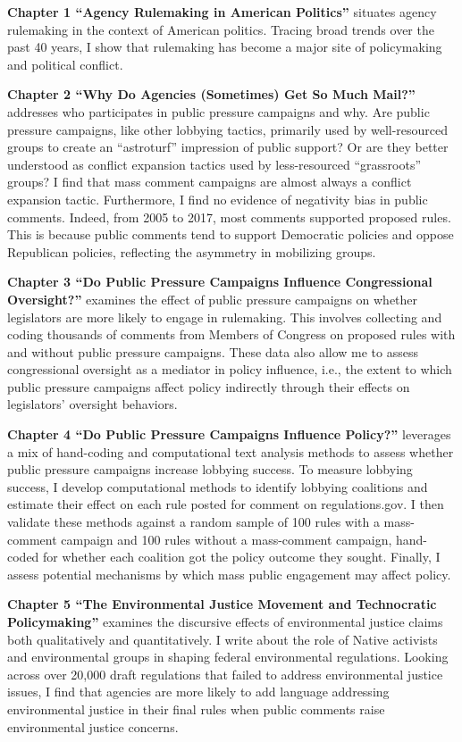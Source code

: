 \documentclass[
]{book}
\begin{document}
\textbf{Chapter 1 ``Agency Rulemaking in American Politics''} situates agency rulemaking in the context of American politics. Tracing broad trends over the past 40 years, I show that rulemaking has become a major site of policymaking and political conflict.

\textbf{Chapter 2 ``Why Do Agencies (Sometimes) Get So Much Mail?''} addresses who participates in public pressure campaigns and why. Are public pressure campaigns, like other lobbying tactics, primarily used by well-resourced groups to create an ``astroturf'' impression of public support? Or are they better understood as conflict expansion tactics used by less-resourced ``grassroots'' groups? I find that mass comment campaigns are almost always a conflict expansion tactic. Furthermore, I find no evidence of negativity bias in public comments. Indeed, from 2005 to 2017, most comments supported proposed rules. This is because public comments tend to support Democratic policies and oppose Republican policies, reflecting the asymmetry in mobilizing groups.

\textbf{Chapter 3 ``Do Public Pressure Campaigns Influence Congressional Oversight?''} examines the effect of public pressure campaigns on whether legislators are more likely to engage in rulemaking. This involves collecting and coding thousands of comments from Members of Congress on proposed rules with and without public pressure campaigns. These data also allow me to assess congressional oversight as a mediator in policy influence, i.e., the extent to which public pressure campaigns affect policy indirectly through their effects on legislators' oversight behaviors.

\textbf{Chapter 4 ``Do Public Pressure Campaigns Influence Policy?''} leverages a mix of hand-coding and computational text analysis methods to assess whether public pressure campaigns increase lobbying success. To measure lobbying success, I develop computational methods to identify lobbying coalitions and estimate their effect on each rule posted for comment on regulations.gov. I then validate these methods against a random sample of 100 rules with a mass-comment campaign and 100 rules without a mass-comment campaign, hand-coded for whether each coalition got the policy outcome they sought. Finally, I assess potential mechanisms by which mass public engagement may affect policy.

\textbf{Chapter 5 ``The Environmental Justice Movement and Technocratic Policymaking''} examines the discursive effects of environmental justice claims both qualitatively and quantitatively. I write about the role of Native activists and environmental groups in shaping federal environmental regulations. Looking across over 20,000 draft regulations that failed to address environmental justice issues, I find that agencies are more likely to add language addressing environmental justice in their final rules when public comments raise environmental justice concerns.
\end{document}
